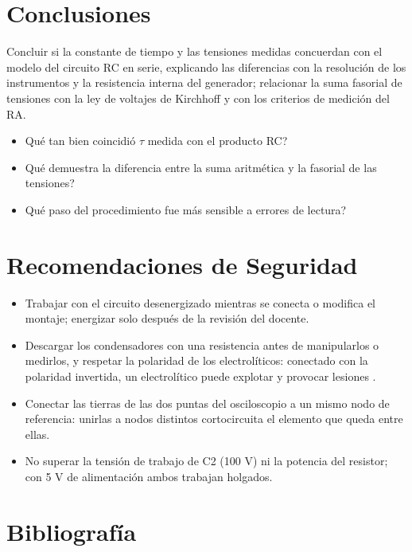 \documentclass[12pt]{article}
\begin{document}
\section{Conclusiones}\label{sec:conclusiones}
Concluir si la constante de tiempo y las tensiones medidas concuerdan con el modelo del circuito RC en serie, explicando las diferencias con la resolución de los instrumentos y la resistencia interna del generador; relacionar la suma fasorial de tensiones con la ley de voltajes de Kirchhoff y con los criterios de medición del RA.
\lineablanco
\begin{itemize}
  \item \textquestiondown{}Qué tan bien coincidió \ensuremath{\tau} medida con el producto RC?
  \item \textquestiondown{}Qué demuestra la diferencia entre la suma aritmética y la fasorial de las tensiones?
  \item \textquestiondown{}Qué paso del procedimiento fue más sensible a errores de lectura?
\end{itemize}

\section{Recomendaciones de Seguridad}\label{sec:seguridad}
\begin{itemize}
  \item Trabajar con el circuito desenergizado mientras se conecta o modifica el montaje; energizar solo después de la revisión del docente.
  \item Descargar los condensadores con una resistencia antes de manipularlos o medirlos, y respetar la polaridad de los electrolíticos: conectado con la polaridad invertida, un electrolítico puede explotar y provocar lesiones \cite{ref1}.
  \item Conectar las tierras de las dos puntas del osciloscopio a un mismo nodo de referencia: unirlas a nodos distintos cortocircuita el elemento que queda entre ellas.
  \item No superar la tensión de trabajo de C2 (100 V) ni la potencia del resistor; con 5 V de alimentación ambos trabajan holgados.
\end{itemize}

\section{Bibliografía}\label{sec:bibliografia}
\nocite{*}
\bibliografia
\end{document}
